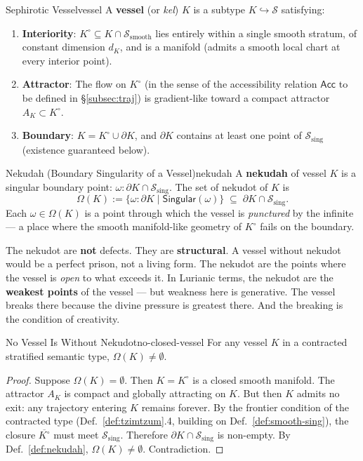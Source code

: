 \documentclass[11pt,a4paper]{article}
\begin{document}
\begin{defbox}{Sephirotic Vessel}{vessel}
A \textbf{vessel} (or \emph{kel}) $K$ is a subtype $K \hookrightarrow \mathcal{S}$ satisfying:
\begin{enumerate}
    \item \textbf{Interiority}: $K^{\circ} \subseteq K \cap \mathcal{S}_{\mathrm{smooth}}$ lies entirely within a single smooth stratum, of constant dimension $d_K$, and is a manifold (admits a smooth local chart at every interior point).
    \item \textbf{Attractor}: The flow on $K^{\circ}$ (in the sense of the accessibility relation $\mathsf{Acc}$ to be defined in §\ref{subsec:traj}) is gradient-like toward a compact attractor $A_K \subset K^{\circ}$.
    \item \textbf{Boundary}: $K = K^{\circ} \cup \partial K$, and $\partial K$ contains at least one point of $\mathcal{S}_{\mathrm{sing}}$ (existence guaranteed below).
\end{enumerate}
\end{defbox}

\begin{defbox}{Nekudah (Boundary Singularity of a Vessel)}{nekudah}
A \textbf{nekudah} of vessel $K$ is a singular boundary point: $\omega : \partial K \cap \mathcal{S}_{\mathrm{sing}}$. The set of nekudot of $K$ is
\[
\Omega(K) := \{ \omega : \partial K \mid \mathsf{Singular}(\omega) \} \;\subseteq\; \partial K \cap \mathcal{S}_{\mathrm{sing}}.
\]
Each $\omega \in \Omega(K)$ is a point through which the vessel is \emph{punctured} by the infinite — a place where the smooth manifold-like geometry of $K^{\circ}$ fails on the boundary.
\end{defbox}

The nekudot are \textbf{not} defects. They are \textbf{structural}. A vessel without nekudot would be a perfect prison, not a living form. The nekudot are the points where the vessel is \emph{open} to what exceeds it. In Lurianic terms, the nekudot are the \textbf{weakest points} of the vessel — but weakness here is generative. The vessel breaks there because the divine pressure is greatest there. And the breaking is the condition of creativity.

\begin{thmbox}{No Vessel Is Without Nekudot}{no-closed-vessel}
For any vessel $K$ in a contracted stratified semantic type, $\Omega(K) \neq \emptyset$.
\end{thmbox}
\begin{proof}
Suppose $\Omega(K) = \emptyset$. Then $K = K^{\circ}$ is a closed smooth manifold. The attractor $A_K$ is compact and globally attracting on $K$. But then $K$ admits no exit: any trajectory entering $K$ remains forever. By the frontier condition of the contracted type (Def.~\ref{def:tzimtzum}.4, building on Def.~\ref{def:smooth-sing}), the closure $\overline{K^{\circ}}$ must meet $\mathcal{S}_{\mathrm{sing}}$. Therefore $\partial K \cap \mathcal{S}_{\mathrm{sing}}$ is non-empty. By Def.~\ref{def:nekudah}, $\Omega(K) \neq \emptyset$. Contradiction.
\end{proof}
\end{document}
